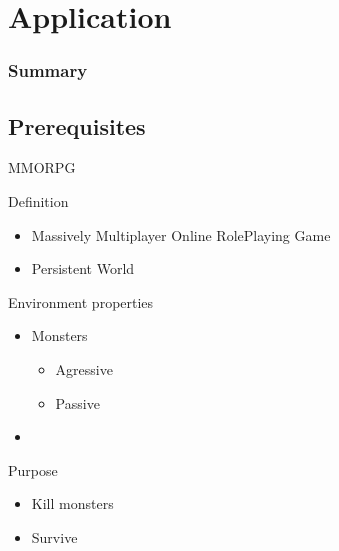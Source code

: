 \section{Application}

\begin{frame}
  \frametitle{Summary}
  \tableofcontents[currentsection]
\end{frame}

\subsection{Prerequisites}

\begin{frame}{MMORPG}
  \begin{block}{Definition}
    \begin{itemize}
    \item Massively Multiplayer Online RolePlaying Game
    \item Persistent World
    \end{itemize}
  \end{block}

  \begin{block}{Environment properties}
    \begin{itemize}
    \item Monsters
      \begin{itemize}
      \item Agressive
      \item Passive
      \end{itemize}
    \item

    \end{itemize}
  \end{block}

  \begin{block}{Purpose}
    \begin{itemize}
    \item Kill monsters
    \item Survive
    \end{itemize}
  \end{block}
\end{frame}

